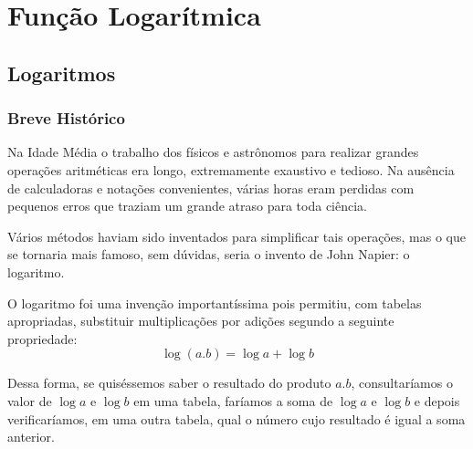 \chapter{Função Logarítmica}
\section{Logaritmos}
\subsection{Breve Histórico}

Na Idade Média o trabalho dos físicos e astrônomos para realizar grandes operações aritméticas era longo, extremamente exaustivo e tedioso. Na ausência de calculadoras e notações convenientes, várias horas eram perdidas com pequenos erros que traziam um grande atraso para toda ciência.
	
	
Vários métodos haviam sido inventados para simplificar tais operações, mas o que se tornaria mais famoso, sem dúvidas, seria o invento de John Napier: o logaritmo.

O logaritmo foi uma invenção importantíssima pois permitiu, com tabelas apropriadas, substituir multiplicações por adições segundo a seguinte propriedade: $$\log{(a.b)} = \log{a} + \log{b}$$

Dessa forma, se quiséssemos saber o resultado do produto $a.b$, consultaríamos o valor de $\log{a}$ e $\log{b}$ em uma tabela, faríamos a soma de $\log{a}$ e $\log{b}$ e depois verificaríamos, em uma outra tabela, qual o número cujo resultado é igual a soma anterior.


